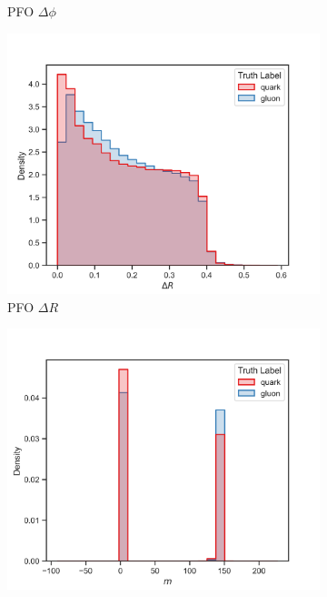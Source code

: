\begin{figure}[!htb]
\begin{subfigure}[t]{0.49\textwidth}
        \caption{PFO $\Delta\phi$}
        \label{fig:app_pfo_deltaPhi}
    \end{subfigure}
    \begin{subfigure}[t]{0.49\textwidth}
        \includegraphics[width=\linewidth]{src/plots/distributions/PFOs/deltaR.png}
        \caption{PFO $\Delta R$}
        \label{fig:app_pfo_deltaR}
    \end{subfigure}
    \begin{subfigure}[t]{0.49\textwidth}
        \includegraphics[width=\linewidth]{src/plots/distributions/PFOs/m.png}

\end{subfigure}
\end{figure}
